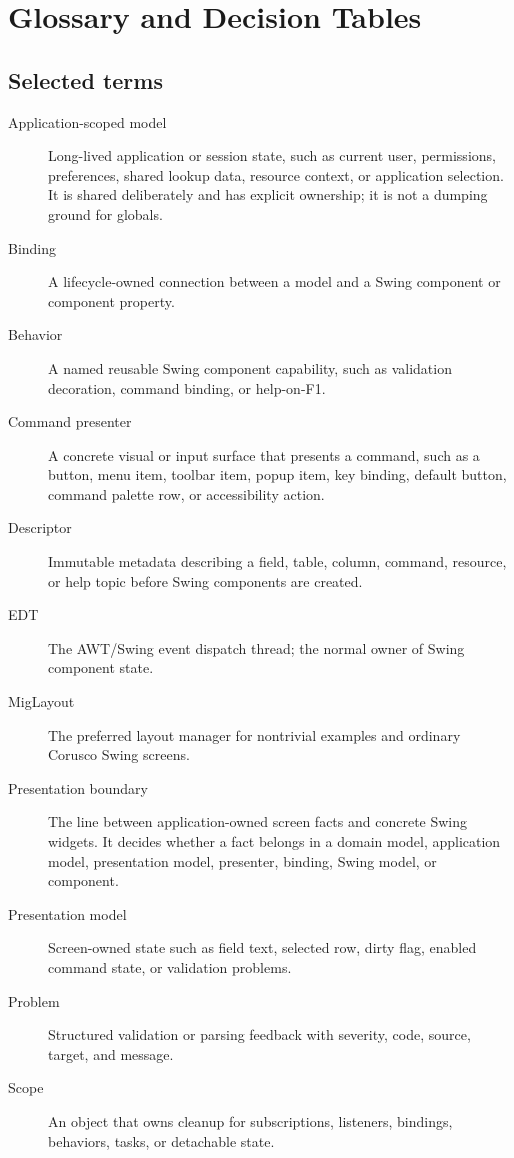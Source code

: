 \chapter{Glossary and Decision Tables}

\section*{Selected terms}

\begin{description}
\item[Application-scoped model] Long-lived application or session state, such as current user, permissions, preferences, shared lookup data, resource context, or application selection. It is shared deliberately and has explicit ownership; it is not a dumping ground for globals.
\item[Binding] A lifecycle-owned connection between a model and a Swing component or component property.
\item[Behavior] A named reusable Swing component capability, such as validation decoration, command binding, or help-on-F1.
\item[Command presenter] A concrete visual or input surface that presents a command, such as a button, menu item, toolbar item, popup item, key binding, default button, command palette row, or accessibility action.
\item[Descriptor] Immutable metadata describing a field, table, column, command, resource, or help topic before Swing components are created.
\item[EDT] The AWT/Swing event dispatch thread; the normal owner of Swing component state.
\item[MigLayout] The preferred layout manager for nontrivial examples and ordinary Corusco Swing screens.
\item[Presentation boundary] The line between application-owned screen facts and concrete Swing widgets. It decides whether a fact belongs in a domain model, application model, presentation model, presenter, binding, Swing model, or component.
\item[Presentation model] Screen-owned state such as field text, selected row, dirty flag, enabled command state, or validation problems.
\item[Problem] Structured validation or parsing feedback with severity, code, source, target, and message.
\item[Scope] An object that owns cleanup for subscriptions, listeners, bindings, behaviors, tasks, or detachable state.

\end{description}
